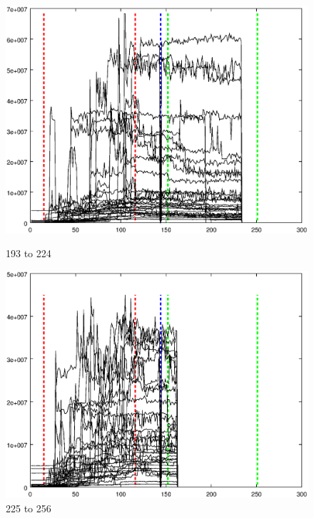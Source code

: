 \documentclass{article}
\begin{document}
\begin{figure}[h]
\centering
\begin{minipage}{.49\textwidth}
	\centering
	\includegraphics[width=0.79\linewidth]{measurement/spad_193-224}
	\caption{193 to 224}
	\label{fig:spad_193-224}
\end{minipage}
\begin{minipage}{.49\textwidth}
	\centering
	\includegraphics[width=0.79\linewidth]{measurement/spad_225-256}
	\caption{225 to 256}
	\label{fig:spad_225-256}
\end{minipage}
\end{figure}
\end{document}
